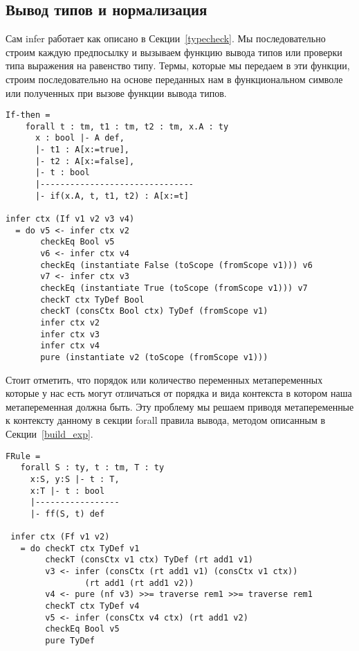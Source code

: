 \subsection{Вывод типов и нормализация}
Сам infer работает как описано в Секции~\ref{typecheck}. Мы последовательно строим каждую предпосылку и вызываем функцию вывода типов или проверки типа выражения на равенство типу. Термы, которые мы передаем в эти функции, строим последовательно на основе переданных нам в функциональном символе или полученных при вызове функции вывода типов.

\begin{lstlisting}[caption={Пример правила вывода и части сгенерированной функции infer, соответствующей этому правилу},captionpos=b, frame=single]
If-then =
    forall t : tm, t1 : tm, t2 : tm, x.A : ty
      x : bool |- A def,
      |- t1 : A[x:=true],
      |- t2 : A[x:=false],
      |- t : bool
      |-------------------------------
      |- if(x.A, t, t1, t2) : A[x:=t]

infer ctx (If v1 v2 v3 v4)
  = do v5 <- infer ctx v2
       checkEq Bool v5
       v6 <- infer ctx v4
       checkEq (instantiate False (toScope (fromScope v1))) v6
       v7 <- infer ctx v3
       checkEq (instantiate True (toScope (fromScope v1))) v7
       checkT ctx TyDef Bool
       checkT (consCtx Bool ctx) TyDef (fromScope v1)
       infer ctx v2
       infer ctx v3
       infer ctx v4
       pure (instantiate v2 (toScope (fromScope v1)))
\end{lstlisting}

Стоит отметить, что порядок или количество переменных метапеременных которые у нас есть могут отличаться от порядка и вида контекста в котором наша метапеременная должна быть. Эту проблему мы решаем приводя метапеременные к контексту данному в секции forall правила вывода, методом описанным в Секции~\ref{build_exp}.

\begin{lstlisting}[caption={Искусственный пример случая несоответствия контекстов (контекст t нужно сократить до использования в предпосылке)},captionpos=b, frame=single]
FRule =
   forall S : ty, t : tm, T : ty
     x:S, y:S |- t : T,
     x:T |- t : bool
     |-----------------
     |- ff(S, t) def

 infer ctx (Ff v1 v2)
   = do checkT ctx TyDef v1
        checkT (consCtx v1 ctx) TyDef (rt add1 v1)
        v3 <- infer (consCtx (rt add1 v1) (consCtx v1 ctx))
                (rt add1 (rt add1 v2))
        v4 <- pure (nf v3) >>= traverse rem1 >>= traverse rem1
        checkT ctx TyDef v4
        v5 <- infer (consCtx v4 ctx) (rt add1 v2)
        checkEq Bool v5
        pure TyDef
\end{lstlisting}


